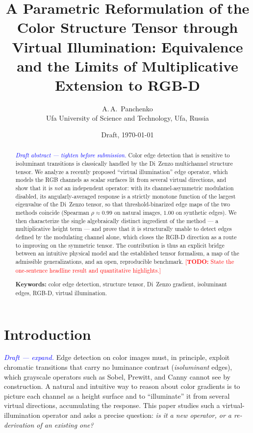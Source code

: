 \documentclass[11pt,a4paper]{article}
\title{A Parametric Reformulation of the Color Structure Tensor
through Virtual Illumination: Equivalence and the Limits of
Multiplicative Extension to RGB-D}
\author{A.\,A.~Panchenko\\
  \small Ufa University of Science and Technology, Ufa, Russia
}
\date{Draft, \today}
\newcommand{\todo}[1]{\textcolor{red}{[\textbf{TODO:} #1]}}
\newcommand{\note}[1]{\textcolor{blue}{\textit{#1}}}
\theoremstyle{plain}
\theoremstyle{definition}
\begin{document}
\maketitle

\begin{abstract}
\note{Draft abstract --- tighten before submission.}
Color edge detection that is sensitive to isoluminant transitions is
classically handled by the Di~Zenzo multichannel structure tensor.
We analyze a recently proposed ``virtual illumination'' edge operator,
which models the RGB channels as scalar surfaces lit from several virtual
directions, and show that it is \emph{not} an independent operator: with its
channel-asymmetric modulation disabled, its angularly-averaged response is a
strictly monotone function of the largest eigenvalue of the Di~Zenzo tensor,
so that threshold-binarized edge maps of the two methods coincide
(Spearman $\rho \approx 0.99$ on natural images, $1.00$ on synthetic edges).
We then characterize the single algebraically distinct ingredient of the
method --- a multiplicative height term --- and prove that it is structurally
unable to detect edges defined by the modulating channel alone, which closes
the RGB-D direction as a route to improving on the symmetric tensor. The
contribution is thus an explicit bridge between an intuitive physical model
and the established tensor formalism, a map of the admissible generalizations,
and an open, reproducible benchmark.
\todo{State the one-sentence headline result and quantitative highlights.}

\medskip
\noindent\textbf{Keywords:} color edge detection, structure tensor, Di~Zenzo
gradient, isoluminant edges, RGB-D, virtual illumination.
\end{abstract}

\section{Introduction}
\label{sec:intro}

\note{Draft --- expand.}
Edge detection on color images must, in principle, exploit chromatic
transitions that carry no luminance contrast (\emph{isoluminant} edges),
which grayscale operators such as Sobel, Prewitt, and Canny cannot see by
construction. A natural and intuitive way to reason about color gradients is
to picture each channel as a height surface and to ``illuminate'' it from
several virtual directions, accumulating the response. This paper studies such
a virtual-illumination operator and asks a precise question: \emph{is it a new
operator, or a re-derivation of an existing one?}
\end{document}
